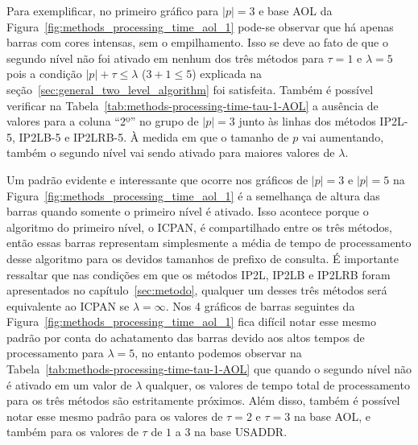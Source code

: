 Para exemplificar, no primeiro gráfico para $|p|=3$ e base AOL da Figura~\ref{fig:methods_processing_time_aol_1} pode-se observar que há apenas barras com cores intensas, sem o empilhamento. Isso se deve ao fato de que o segundo nível não foi ativado em nenhum dos três métodos para $\tau=1$ e $\lambda=5$ pois a condição $|p| + \tau \leq \lambda$ ($3 + 1 \leq 5$) explicada na seção~\ref{sec:general_two_level_algorithm} foi satisfeita. Também é possível verificar na Tabela~\ref{tab:methods-processing-time-tau-1-AOL} a ausência de valores para a coluna  ``2º'' no grupo de $|p|=3$ junto às linhas dos métodos IP2L-5, IP2LB-5 e IP2LRB-5. À medida em que o tamanho de $p$ vai aumentando, também o segundo nível vai sendo ativado para maiores valores de $\lambda$.

Um padrão evidente e interessante que ocorre nos gráficos de $|p|=3$ e $|p|=5$ na Figura~\ref{fig:methods_processing_time_aol_1} é a semelhança de altura das barras quando somente o primeiro nível é ativado. Isso acontece porque o algoritmo do primeiro nível, o ICPAN, é compartilhado entre os três métodos, então essas barras representam simplesmente a média de tempo de processamento desse algoritmo para os devidos tamanhos de prefixo de consulta. É importante ressaltar que nas condições em que os métodos IP2L, IP2LB e IP2LRB foram apresentados no capítulo~\ref{sec:metodo}, qualquer um desses três métodos será equivalente ao ICPAN se $\lambda=\infty$. Nos 4 gráficos de barras seguintes da Figura~\ref{fig:methods_processing_time_aol_1} fica difícil notar esse mesmo padrão por conta do achatamento das barras devido aos altos tempos de processamento para $\lambda=5$, no entanto podemos observar na Tabela~\ref{tab:methods-processing-time-tau-1-AOL} que quando o segundo nível não é ativado em um valor de $\lambda$ qualquer, os valores de tempo total de processamento para os três métodos são estritamente próximos. Além disso, também é possível notar esse mesmo padrão para os valores de $\tau=2$ e $\tau=3$ na base AOL, e também para os valores de $\tau$ de $1$ a $3$ na base USADDR.

